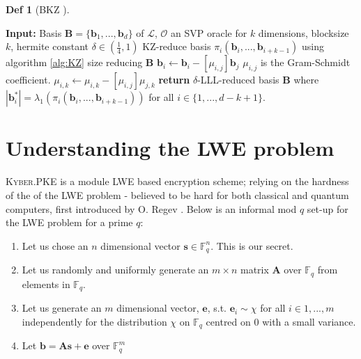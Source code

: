 \documentclass[a4paper, 10pt]{article}
\theoremstyle{definition}
\newtheorem{definition}{Def}[section]
\begin{document}
\begin{definition}[\ac{BKZ} \cite{10.1007/3-540-54458-5_51}]
    \begin{algorithm}[H]
        \caption{\ac{BKZ} algorithm}\label{alg:BKZ}
        \begin{algorithmic}[1]
        \State \textbf{Input:} Basis $\mathbf{B} = \{\mathbf{b}_1,...,\mathbf{b}_d\}$ of $\mathcal{L}$, $\mathcal{O}$ an \ac{SVP} oracle for $k$ dimensions, blocksize $k$, hermite constant $\delta\in (\frac{1}{4}, 1)$
                \State KZ-reduce basis $\pi_i(\mathbf{b}_i,...,\mathbf{b}_{i+k-1})$ using algorithm \ref{alg:KZ}
                 \Comment size reducing $\mathbf{B}$
                        \State $\mathbf{b}_i \gets \mathbf{b}_i - \left[ \mu _{i,j}\right] \mathbf{b}_j$ \Comment $\mu _{i,j}$ is the Gram-Schmidt coefficient.
                            \State $\mu _{i,k} \gets \mu_{i,k} - \left[\mu_{i,j}\right]\mu_{j,k}$
                        \EndFor
                    \EndFor
                \EndFor
            \EndFor
        \EndWhile
        \State \textbf{return} $\delta $-\ac{LLL}-reduced basis $\mathbf{B}$ where $|\mathbf{b}_i^*|=\lambda_1(\pi_i(\mathbf{b}_i,...,\mathbf{b}_{i+k-1}))$ for all $i\in\{1,...,d-k+1\}$.
        \end{algorithmic}
    \end{algorithm}
\end{definition}

\newpage

\section{Understanding the LWE problem}

\textsc{Kyber}.\ac{PKE} is a module \ac{LWE} based encryption scheme; relying on the hardness of the of the \ac{LWE} problem -  believed to be hard for both classical and quantum computers, first introduced by O. Regev \cite{10.1145/1060590.1060603}. Below is an informal mod $q$ set-up for the \ac{LWE} problem for a prime $q$:

\begin{enumerate}
    \item Let us chose an $n$ dimensional vector $\mathbf{s} \in \mathbb{F}^n_q$. This is our secret.
    \item Let us randomly and uniformly generate an $m\times n$ matrix $\mathbf{A} $ over $\mathbb{F}_q$ from elements in $\mathbb{F} _q$.
    \item Let us generate an $m$ dimensional vector, $\mathbf{e}$, s.t. $\mathbf{e}_i\sim \chi$ for all $i \in {1,...,m}$ independently for the distribution $\chi$ on $\mathbb{F}_q$ centred on $0$ with a small variance.
    \item Let $\mathbf{b} = \mathbf{A}\mathbf{s}+\mathbf{e}$ over $\mathbb{F}_q^m$
\end{enumerate}
\end{document}
